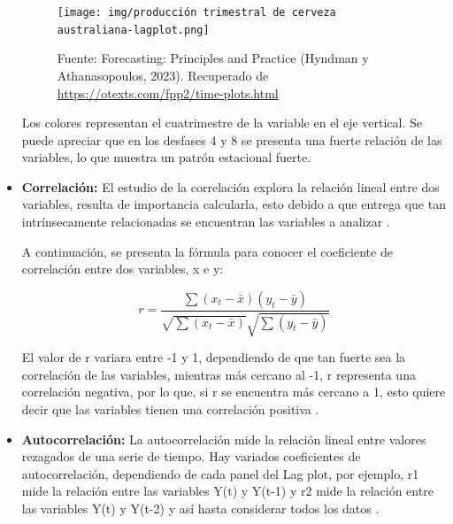 \begin{itemize}
\begin{figure}[H]
        \vspace{10pt}
    
        \begin{minipage}[b]{1.1\textwidth}
            \centering
            \texttt{[image: img/producción trimestral de cerveza australiana-lagplot.png]}        
        \end{minipage}
    
        \begin{minipage}[t]{0.9\textwidth}
            Fuente: Forecasting: Principles and Practice (Hyndman y Athanasopoulos, 2023). Recuperado de \url{https://otexts.com/fpp2/time-plots.html}
        \end{minipage}
    \end{figure}
    
    Los colores representan el cuatrimestre de la variable en el eje vertical. Se puede apreciar que en los desfases 4 y 8 se presenta una fuerte relación de las variables, lo que muestra un patrón estacional fuerte. 

    \item \textbf{Correlación:} El estudio de la correlación explora la relación lineal entre dos variables, resulta de importancia calcularla, esto debido a que entrega que tan intrínsecamente relacionadas se encuentran las variables a analizar \cite{forecast-time-series-arima}. 
    
    A continuación, se presenta la fórmula para conocer el coeficiente de correlación entre dos variables, x e y:

    \begin{equation*}
        r = \frac{\sum{(x_t - \bar{x})(y_t - \bar{y})}}{{\sqrt{\sum{(x_t - \bar{x})}}\sqrt{\sum{(y_t - \bar{y})}}}}
    \end{equation*}    
    
    El valor de r variara entre -1 y 1, dependiendo de que tan fuerte sea la correlación de las variables, mientras más cercano al -1, r representa una correlación negativa, por lo que, si r se encuentra más cercano a 1, esto quiere decir que las variables tienen una correlación positiva \cite{forecast-time-series-arima}.

    \item \textbf{Autocorrelación:} La autocorrelación mide la relación lineal entre valores rezagados de una serie de tiempo. Hay variados coeficientes de autocorrelación, dependiendo de cada panel del Lag plot, por ejemplo, r1 mide la relación entre las variables Y(t) y Y(t-1) y r2 mide la relación entre las variables Y(t) y Y(t-2) y así hasta considerar todos los datos \cite{forecast-time-series-arima}.
    

\end{itemize}
